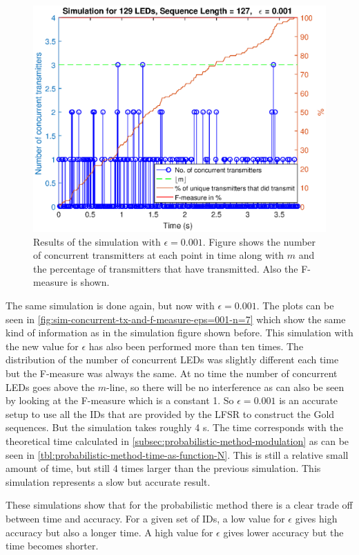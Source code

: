 \begin{figure}[ht]
	\centering
	\includegraphics[width=\textwidth]{chapters/evaluation-chapters/simulation/sim-concurrent-tx-and-f-measure-eps=001-n=7.eps}
	\caption{Results of the simulation with $\epsilon = 0.001$. Figure shows the number of concurrent transmitters at each point in time along with $m$ and the percentage of transmitters that have transmitted. Also the F-measure is shown.}
	\label{fig:sim-concurrent-tx-and-f-measure-eps=001-n=7}
\end{figure}






The same simulation is done again, but now with $\epsilon = 0.001$.
The plots can be seen in \autoref{fig:sim-concurrent-tx-and-f-measure-eps=001-n=7} which show the same kind of information as in the simulation figure shown before.
This simulation with the new value for $\epsilon$ has also been performed more than ten times.
The distribution of the number of concurrent LEDs was slightly different each time but the F-measure was always the same.
At no time the number of concurrent LEDs goes above the $m$-line, so there will be no interference as can also be seen by looking at the F-measure which is a constant 1.
So $\epsilon = 0.001$ is an accurate setup to use all the IDs that are provided by the LFSR to construct the Gold sequences.
But the simulation takes roughly 4 s.
The time corresponds with the theoretical time calculated in \autoref{subsec:probabilistic-method-modulation} as can be seen in \autoref{tbl:probabilistic-method-time-as-function-N}.
This is still a relative small amount of time, but still 4 times larger than the previous simulation.
This simulation represents a slow but accurate result.



 

These simulations show that for the probabilistic method there is a clear trade off between time and accuracy.
For a given set of IDs, a low value for $\epsilon$ gives high accuracy but also a longer time.
A high value for $\epsilon$ gives lower accuracy but the time becomes shorter.
